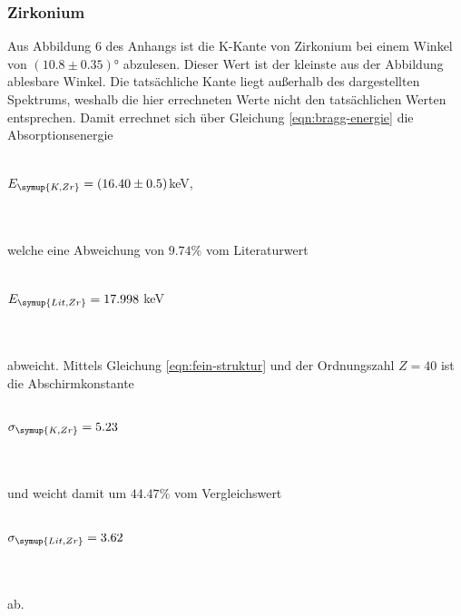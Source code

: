         \subsubsection{Zirkonium}
            Aus Abbildung 6 des Anhangs ist die K-Kante von Zirkonium bei einem 
            Winkel von $(10.8 \pm 0.35)°$ abzulesen. Dieser Wert ist der kleinste aus der Abbildung ablesbare Winkel. Die 
            tatsächliche Kante liegt außerhalb des dargestellten Spektrums, weshalb die hier errechneten Werte nicht den tatsächlichen 
            Werten entsprechen.
            Damit errechnet sich über Gleichung \eqref{eqn:bragg-energie} die Absorptionsenergie
            \\ \\
            \centerline{$E_{\symup{K, Zr}} = (16.40 \pm 0.5)$keV,}  
            \\ \\
            welche eine Abweichung von $9.74 \%$ vom Literaturwert
            \\ \\
            \centerline{$E_{\symup{Lit, Zr}} = 17.998$ keV \cite{periodic}}
            \\ \\
            abweicht. Mittels Gleichung \eqref{eqn:fein-struktur} und der Ordnungszahl $Z = 40$
            ist die Abschirmkonstante
            \\ \\
            \centerline{$\sigma_{\symup{K, Zr}} = 5.23$} 
            \\ \\
            und weicht damit um $44.47 \%$ vom Vergleichswert
            \\ \\
            \centerline{$\sigma_{\symup{Lit, Zr}} = 3.62$}
            \\ \\
            ab.
